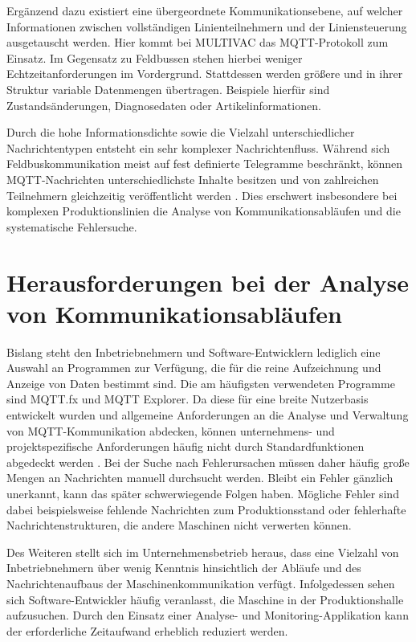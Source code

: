 Ergänzend dazu existiert eine übergeordnete Kommunikationsebene, auf welcher Informationen zwischen vollständigen Linienteilnehmern und der Liniensteuerung ausgetauscht werden. Hier kommt bei MULTIVAC das MQTT-Protokoll zum Einsatz. Im Gegensatz zu Feldbussen stehen hierbei weniger Echtzeitanforderungen im Vordergrund. Stattdessen werden größere und in ihrer Struktur variable Datenmengen übertragen. Beispiele hierfür sind Zustandsänderungen, Diagnosedaten oder Artikelinformationen. \autocite{MQTTMessageQueue} 

Durch die hohe Informationsdichte sowie die Vielzahl unterschiedlicher Nachrichtentypen entsteht ein sehr komplexer Nachrichtenfluss. Während sich Feldbuskommunikation meist auf fest definierte Telegramme beschränkt, können MQTT-Nachrichten unterschiedlichste Inhalte besitzen \autocite[69]{IoTMQTT} und von zahlreichen Teilnehmern gleichzeitig veröffentlicht werden \autocite[11]{hivemqMQTTMQTT5}. Dies erschwert insbesondere bei komplexen Produktionslinien die Analyse von Kommunikationsabläufen und die systematische Fehlersuche.

\section{Herausforderungen bei der Analyse von Kommunikationsabläufen}
Bislang steht den Inbetriebnehmern und Software-Entwicklern lediglich eine Auswahl an Programmen zur Verfügung, die für die reine Aufzeichnung und Anzeige von Daten bestimmt sind. Die am häufigsten verwendeten Programme sind MQTT.fx und MQTT Explorer. Da diese für eine breite Nutzerbasis entwickelt wurden und allgemeine Anforderungen an die Analyse und Verwaltung von MQTT-Kommunikation abdecken, können unternehmens- und projektspezifische Anforderungen häufig nicht durch Standardfunktionen abgedeckt werden \autocite[13--14]{brooksNoSilverBullet1987}. Bei der Suche nach Fehlerursachen müssen daher häufig große Mengen an Nachrichten manuell durchsucht werden. Bleibt ein Fehler gänzlich unerkannt, kann das später schwerwiegende Folgen haben. Mögliche Fehler sind dabei beispielsweise fehlende Nachrichten zum Produktionsstand oder fehlerhafte Nachrichtenstrukturen, die andere Maschinen nicht verwerten können.

Des Weiteren stellt sich im Unternehmensbetrieb heraus, dass eine Vielzahl von Inbetriebnehmern über wenig Kenntnis hinsichtlich der Abläufe und des Nachrichtenaufbaus der Maschinenkommunikation verfügt. Infolgedessen sehen sich Software-Entwickler häufig veranlasst, die Maschine in der Produktionshalle aufzusuchen. Durch den Einsatz einer Analyse- und Monitoring-Applikation kann der erforderliche Zeitaufwand erheblich reduziert werden.